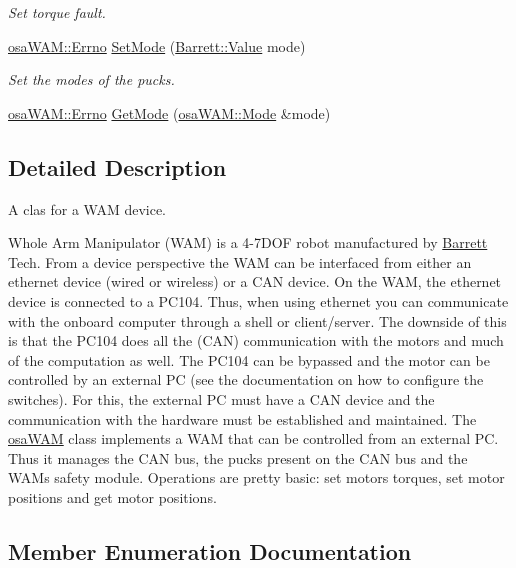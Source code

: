 \begin{DoxyCompactItemize}
\begin{DoxyCompactList}\small\item\em Set torque fault. \end{DoxyCompactList}\item 
\hyperlink{classosa_w_a_m_aff15893cc52d67e46cb66de794109f9e}{osa\+W\+A\+M\+::\+Errno} \hyperlink{classosa_w_a_m_a88bd8bca8f85f58fb629fb6cdb7671e8}{Set\+Mode} (\hyperlink{struct_barrett_a57ff132885344ca62e4b4b691885685b}{Barrett\+::\+Value} mode)
\begin{DoxyCompactList}\small\item\em Set the modes of the pucks. \end{DoxyCompactList}\item 
\hyperlink{classosa_w_a_m_aff15893cc52d67e46cb66de794109f9e}{osa\+W\+A\+M\+::\+Errno} \hyperlink{classosa_w_a_m_a1e717c2a9cb551b6c1a232a5d3b3fbf9}{Get\+Mode} (\hyperlink{classosa_w_a_m_a3671dc191688751cf712bbbd5f36a0d0}{osa\+W\+A\+M\+::\+Mode} \&mode)
\end{DoxyCompactItemize}


\subsection{Detailed Description}
A clas for a W\+A\+M device. 

Whole Arm Manipulator (W\+A\+M) is a 4-\/7\+D\+O\+F robot manufactured by \hyperlink{struct_barrett}{Barrett} Tech. From a device perspective the W\+A\+M can be interfaced from either an ethernet device (wired or wireless) or a C\+A\+N device. On the W\+A\+M, the ethernet device is connected to a P\+C104. Thus, when using ethernet you can communicate with the onboard computer through a shell or client/server. The downside of this is that the P\+C104 does all the (C\+A\+N) communication with the motors and much of the computation as well. The P\+C104 can be bypassed and the motor can be controlled by an external P\+C (see the documentation on how to configure the switches). For this, the external P\+C must have a C\+A\+N device and the communication with the hardware must be established and maintained. The \hyperlink{classosa_w_a_m}{osa\+W\+A\+M} class implements a W\+A\+M that can be controlled from an external P\+C. Thus it manages the C\+A\+N bus, the pucks present on the C\+A\+N bus and the W\+A\+M\textquotesingle{}s safety module. Operations are pretty basic\+: set motors torques, set motor positions and get motor positions. 

\subsection{Member Enumeration Documentation}
\hypertarget{classosa_w_a_m_ada0b00e10e6401b6b1801cd08f30748b}{}
